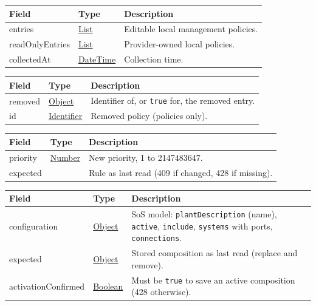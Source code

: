 \documentclass[a4paper]{arrowhead}
\newcommand{\mref}[2][]{{\textcolor{ArrowheadPurple}{\hyperref[sec:model:#2]{\ifstrempty{#1}{#2}{#1}}}}}
\newcommand{\pref}[1]{{\textcolor{ArrowheadGrey}{\hyperref[sec:model:primitives:#1]{#1}}}}
\begin{document}

\noindent\begin{tabularx}{\textwidth}{| >{\raggedright\arraybackslash}p{3.9cm} | >{\raggedright\arraybackslash\small}p{5.3cm} | X |} \hline
\rowcolor{gray!33} Field & Type & Description \\ \hline
entries & \pref{List} & Editable local management policies. \\ \hline
readOnlyEntries & \pref{List} & Provider-owned local policies. \\ \hline
collectedAt & \pref{DateTime} & Collection time. \\ \hline
\end{tabularx}



\noindent\begin{tabularx}{\textwidth}{| >{\raggedright\arraybackslash}p{3.9cm} | >{\raggedright\arraybackslash\small}p{5.3cm} | X |} \hline
\rowcolor{gray!33} Field & Type & Description \\ \hline
removed & \pref{Object} & Identifier of, or \texttt{true} for, the removed entry. \\ \hline
id & \pref{Identifier} & Removed policy (policies only). \\ \hline
\end{tabularx}



\noindent\begin{tabularx}{\textwidth}{| >{\raggedright\arraybackslash}p{3.9cm} | >{\raggedright\arraybackslash\small}p{5.3cm} | X |} \hline
\rowcolor{gray!33} Field & Type & Description \\ \hline
priority & \pref{Number} & New priority, 1 to 2147483647. \\ \hline
expected & \mref{OrchestrationRule} & Rule as last read (409 if changed, 428 if missing). \\ \hline
\end{tabularx}



\noindent\begin{tabularx}{\textwidth}{| >{\raggedright\arraybackslash}p{3.9cm} | >{\raggedright\arraybackslash\small}p{5.3cm} | X |} \hline
\rowcolor{gray!33} Field & Type & Description \\ \hline
configuration & \pref{Object} & SoS model: \texttt{plantDescription} (name), \texttt{active}, \texttt{include}, \texttt{systems} with ports, \texttt{connections}. \\ \hline
expected & \pref{Object} & Stored composition as last read (replace and remove). \\ \hline
activationConfirmed & \pref{Boolean} & Must be \texttt{true} to save an active composition (428 otherwise). \\ \hline
\end{tabularx}
\end{document}
